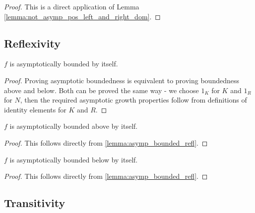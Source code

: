 \begin{proof}
    \leanok
    This is a direct application of Lemma \ref{lemma:not_asymp_pos_left_and_right_dom}. 
\end{proof}


\subsection{Reflexivity}

\begin{lemma}
    \label{lemma:asymp_bounded_refl}
    \leanok
    $f$ is asymptotically bounded by itself. 

\end{lemma}

\begin{proof}
    \leanok
    Proving asymptotic boundedness is equivalent to proving boundedness above and below.
    Both can be proved the same way - we choose $1_K$ for $K$ and $1_R$ for $N$, then the
    required asymptotic growth properties follow from definitions of identity elements for 
    $K$ and $R$.
\end{proof}

\begin{lemma}
    \label{lemma:asymp_bounded_above_refl}
    \leanok
    $f$ is asymptotically bounded above by itself.
\end{lemma}

\begin{proof}
    \leanok
    This follows directly from \ref{lemma:asymp_bounded_refl}.
\end{proof}

\begin{lemma}
    \label{lemma:asymp_bounded_below_refl}
    \leanok
    $f$ is asymptotically bounded below by itself.
\end{lemma}

\begin{proof}
    \leanok
    This follows directly from \ref{lemma:asymp_bounded_refl}.
\end{proof}


\subsection{Transitivity}

